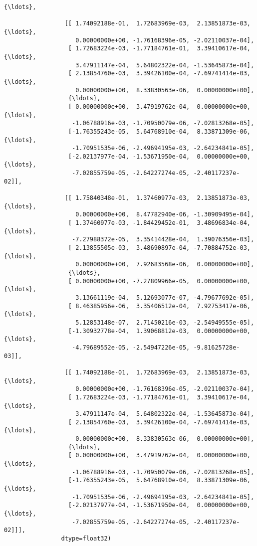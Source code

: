 \documentclass[11pt]{article}
\begin{document}
\begin{Verbatim}[commandchars=\\\{\}]
                 {\ldots},
          
                 [[ 1.74092188e-01,  1.72683969e-03,  2.13851873e-03, {\ldots},
                    0.00000000e+00, -1.76168396e-05, -2.02110037e-04],
                  [ 1.72683224e-03, -1.77184761e-01,  3.39410617e-04, {\ldots},
                    3.47911147e-04,  5.64802322e-04, -1.53645873e-04],
                  [ 2.13854760e-03,  3.39426100e-04, -7.69741414e-03, {\ldots},
                    0.00000000e+00,  8.33830563e-06,  0.00000000e+00],
                  {\ldots},
                  [ 0.00000000e+00,  3.47919762e-04,  0.00000000e+00, {\ldots},
                   -1.06788916e-03, -1.70950079e-06, -7.02813268e-05],
                  [-1.76355243e-05,  5.64768910e-04,  8.33871309e-06, {\ldots},
                   -1.70951535e-06, -2.49694195e-03, -2.64234841e-05],
                  [-2.02137977e-04, -1.53671950e-04,  0.00000000e+00, {\ldots},
                   -7.02855759e-05, -2.64227274e-05, -2.40117237e-02]],
          
                 [[ 1.75840348e-01,  1.37460977e-03,  2.13851873e-03, {\ldots},
                    0.00000000e+00,  8.47782940e-06, -1.30909495e-04],
                  [ 1.37460977e-03, -1.84429452e-01,  3.48696834e-04, {\ldots},
                   -7.27988372e-05,  3.35414428e-04,  1.39076356e-03],
                  [ 2.13855505e-03,  3.48690897e-04, -7.70884752e-03, {\ldots},
                    0.00000000e+00,  7.92683568e-06,  0.00000000e+00],
                  {\ldots},
                  [ 0.00000000e+00, -7.27809966e-05,  0.00000000e+00, {\ldots},
                    3.13661119e-04,  5.12693077e-07, -4.79677692e-05],
                  [ 8.46385956e-06,  3.35406512e-04,  7.92753417e-06, {\ldots},
                    5.12853148e-07,  2.71450216e-03, -2.54949555e-05],
                  [-1.30932778e-04,  1.39068812e-03,  0.00000000e+00, {\ldots},
                   -4.79689552e-05, -2.54947226e-05, -9.81625728e-03]],
          
                 [[ 1.74092188e-01,  1.72683969e-03,  2.13851873e-03, {\ldots},
                    0.00000000e+00, -1.76168396e-05, -2.02110037e-04],
                  [ 1.72683224e-03, -1.77184761e-01,  3.39410617e-04, {\ldots},
                    3.47911147e-04,  5.64802322e-04, -1.53645873e-04],
                  [ 2.13854760e-03,  3.39426100e-04, -7.69741414e-03, {\ldots},
                    0.00000000e+00,  8.33830563e-06,  0.00000000e+00],
                  {\ldots},
                  [ 0.00000000e+00,  3.47919762e-04,  0.00000000e+00, {\ldots},
                   -1.06788916e-03, -1.70950079e-06, -7.02813268e-05],
                  [-1.76355243e-05,  5.64768910e-04,  8.33871309e-06, {\ldots},
                   -1.70951535e-06, -2.49694195e-03, -2.64234841e-05],
                  [-2.02137977e-04, -1.53671950e-04,  0.00000000e+00, {\ldots},
                   -7.02855759e-05, -2.64227274e-05, -2.40117237e-02]]],
                dtype=float32)
\end{Verbatim}
            
\end{document}
